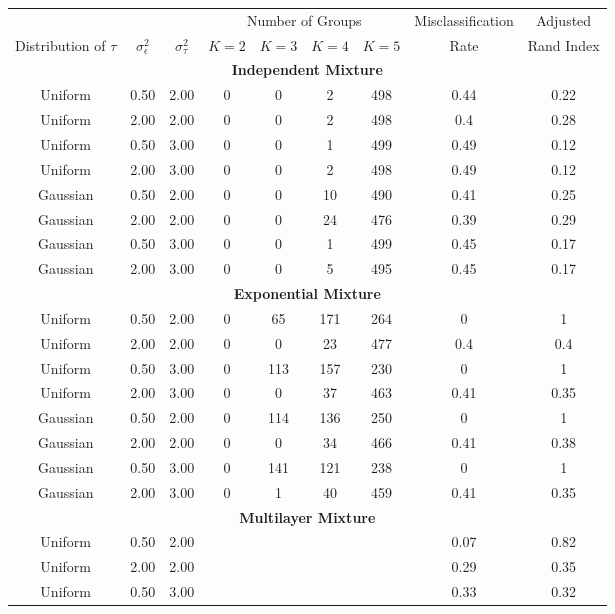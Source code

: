 \documentclass[12pt]{article}
\begin{document}
\begin{table}[ht]
\begin{center}
\begin{tabular}{ccc|cccccc}
  \hline &&&\multicolumn{4}{c}{Number of Groups}&Misclassification&Adjusted\\ Distribution of $\tau$&$\sigma_{\epsilon}^2$&$\sigma_{\tau}^2$&$K=2$&$K=3$&$K=4$&$K=5$&Rate&Rand Index\\ \hline\multicolumn{9}{c}{\textbf{Independent Mixture}}\\ Uniform & 0.50 & 2.00 & 0 & 0 & 2 & 498 & 0.44 & 0.22 \\ 
  Uniform & 2.00 & 2.00 & 0 & 0 & 2 & 498 & 0.4 & 0.28 \\ 
  Uniform & 0.50 & 3.00 & 0 & 0 & 1 & 499 & 0.49 & 0.12 \\ 
  Uniform & 2.00 & 3.00 & 0 & 0 & 2 & 498 & 0.49 & 0.12 \\ 
  Gaussian & 0.50 & 2.00 & 0 & 0 & 10 & 490 & 0.41 & 0.25 \\ 
  Gaussian & 2.00 & 2.00 & 0 & 0 & 24 & 476 & 0.39 & 0.29 \\ 
  Gaussian & 0.50 & 3.00 & 0 & 0 & 1 & 499 & 0.45 & 0.17 \\ 
  Gaussian & 2.00 & 3.00 & 0 & 0 & 5 & 495 & 0.45 & 0.17 \\ 
   \multicolumn{9}{c}{\textbf{Exponential Mixture}}\\Uniform & 0.50 & 2.00 & 0 & 65 & 171 & 264 & 0 & 1 \\ 
  Uniform & 2.00 & 2.00 & 0 & 0 & 23 & 477 & 0.4 & 0.4 \\ 
  Uniform & 0.50 & 3.00 & 0 & 113 & 157 & 230 & 0 & 1 \\ 
  Uniform & 2.00 & 3.00 & 0 & 0 & 37 & 463 & 0.41 & 0.35 \\ 
  Gaussian & 0.50 & 2.00 & 0 & 114 & 136 & 250 & 0 & 1 \\ 
  Gaussian & 2.00 & 2.00 & 0 & 0 & 34 & 466 & 0.41 & 0.38 \\ 
  Gaussian & 0.50 & 3.00 & 0 & 141 & 121 & 238 & 0 & 1 \\ 
  Gaussian & 2.00 & 3.00 & 0 & 1 & 40 & 459 & 0.41 & 0.35 \\ 
   \multicolumn{9}{c}{\textbf{Multilayer Mixture}}\\Uniform & 0.50 & 2.00 &  &  &  &  & 0.07 & 0.82 \\ 
  Uniform & 2.00 & 2.00 &  &  &  &  & 0.29 & 0.35 \\ 
  Uniform & 0.50 & 3.00 &  &  &  &  & 0.33 & 0.32 \\ 

\end{tabular}
\end{center}
\end{table}
\end{document}
